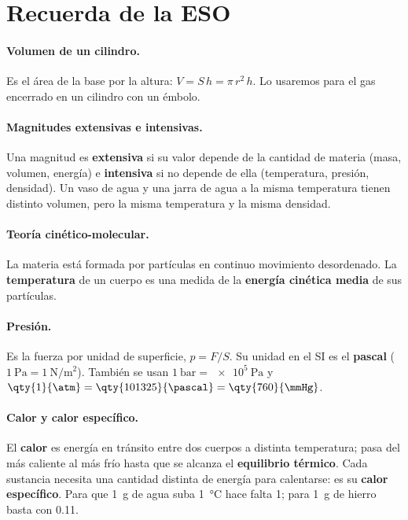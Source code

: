 \section{Recuerda de la ESO}\label{sec:ud13-eso}

\paragraph{Volumen de un cilindro.} Es el área de la base por la altura: \(V = S\,h = \pi\,r^2\,h\). Lo usaremos para el gas
encerrado en un cilindro con un émbolo.

\paragraph{Magnitudes extensivas e intensivas.} Una magnitud es \textbf{extensiva} si su valor depende de la cantidad de materia
(masa, volumen, energía) e \textbf{intensiva} si no depende de ella (temperatura, presión, densidad). Un vaso de agua y una jarra de
agua a la misma temperatura tienen distinto volumen, pero la misma temperatura y la misma densidad.

\paragraph{Teoría cinético-molecular.} La materia está formada por partículas en continuo movimiento desordenado. La
\textbf{temperatura} de un cuerpo es una medida de la \textbf{energía cinética media} de sus partículas.

\paragraph{Presión.} Es la fuerza por unidad de superficie, \(p = F/S\). Su unidad en el SI es el \textbf{pascal} (\(\qty{1}{\pascal}
= \qty{1}{\newton\per\m\squared}\)). También se usan \(\qty{1}{\bar} = \qty{e5}{\pascal}\) y \(\qty{1}{\atm} = \qty{101325}{\pascal} =
\qty{760}{\mmHg}\).

\paragraph{Calor y calor específico.} El \textbf{calor} es energía en tránsito entre dos cuerpos a distinta temperatura; pasa del
más caliente al más frío hasta que se alcanza el \textbf{equilibrio térmico}. Cada sustancia necesita una cantidad distinta de
energía para calentarse: es su \textbf{calor específico}. Para que \qty{1}{\g} de agua suba \qty{1}{\degreeCelsius} hace falta
\qty{1}{\calorie}; para \qty{1}{\g} de hierro basta con \qty{0.11}{\calorie}.

